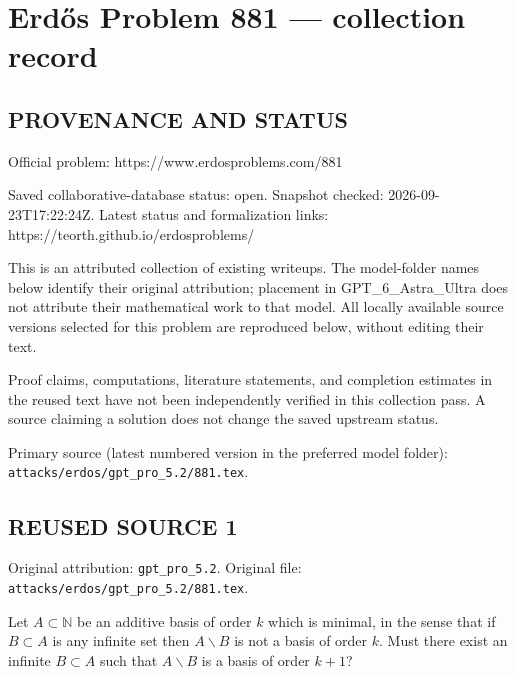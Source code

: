 \section*{Erd\H{o}s Problem 881 --- collection record}

\subsection*{PROVENANCE AND STATUS}
Official problem: https://www.erdosproblems.com/881

Saved collaborative-database status: open.
Snapshot checked: 2026-09-23T17:22:24Z.
Latest status and formalization links: https://teorth.github.io/erdosproblems/

This is an attributed collection of existing writeups. The model-folder names below identify their original attribution; placement in GPT\_6\_Astra\_Ultra does not attribute their mathematical work to that model. All locally available source versions selected for this problem are reproduced below, without editing their text.

Proof claims, computations, literature statements, and completion estimates in the reused text have not been independently verified in this collection pass. A source claiming a solution does not change the saved upstream status.

Primary source (latest numbered version in the preferred model folder): \texttt{attacks/erdos/gpt\_pro\_5.2/881.tex}.

\subsection*{REUSED SOURCE 1}
Original attribution: \texttt{gpt\_pro\_5.2}.
Original file: \texttt{attacks/erdos/gpt\_pro\_5.2/881.tex}.



Let $A\subset\mathbb{N}$ be an additive basis of order $k$ which is minimal, in the sense that if $B\subset A$ is any infinite set then $A\backslash B$ is not a basis of order $k$. Must there exist an infinite $B\subset A$ such that $A\backslash B$ is a basis of order $k+1$?

